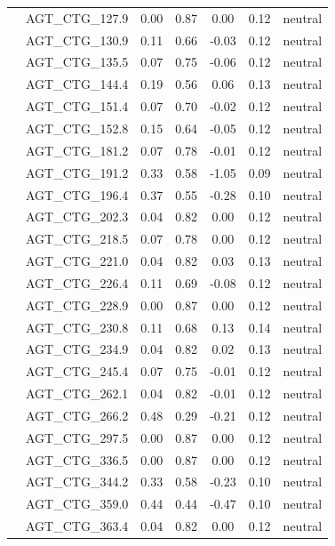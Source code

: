 \documentclass[11pt,]{article}
\begin{document}
\begin{longtable}[c]{@{}lcccccc@{}}
& AGT\_CTG\_127.9 & 0.00 & 0.87 & 0.00 & 0.12 & neutral
\\\addlinespace
& AGT\_CTG\_130.9 & 0.11 & 0.66 & -0.03 & 0.12 & neutral
\\\addlinespace
& AGT\_CTG\_135.5 & 0.07 & 0.75 & -0.06 & 0.12 & neutral
\\\addlinespace
& AGT\_CTG\_144.4 & 0.19 & 0.56 & 0.06 & 0.13 & neutral
\\\addlinespace
& AGT\_CTG\_151.4 & 0.07 & 0.70 & -0.02 & 0.12 & neutral
\\\addlinespace
& AGT\_CTG\_152.8 & 0.15 & 0.64 & -0.05 & 0.12 & neutral
\\\addlinespace
& AGT\_CTG\_181.2 & 0.07 & 0.78 & -0.01 & 0.12 & neutral
\\\addlinespace
& AGT\_CTG\_191.2 & 0.33 & 0.58 & -1.05 & 0.09 & neutral
\\\addlinespace
& AGT\_CTG\_196.4 & 0.37 & 0.55 & -0.28 & 0.10 & neutral
\\\addlinespace
& AGT\_CTG\_202.3 & 0.04 & 0.82 & 0.00 & 0.12 & neutral
\\\addlinespace
& AGT\_CTG\_218.5 & 0.07 & 0.78 & 0.00 & 0.12 & neutral
\\\addlinespace
& AGT\_CTG\_221.0 & 0.04 & 0.82 & 0.03 & 0.13 & neutral
\\\addlinespace
& AGT\_CTG\_226.4 & 0.11 & 0.69 & -0.08 & 0.12 & neutral
\\\addlinespace
& AGT\_CTG\_228.9 & 0.00 & 0.87 & 0.00 & 0.12 & neutral
\\\addlinespace
& AGT\_CTG\_230.8 & 0.11 & 0.68 & 0.13 & 0.14 & neutral
\\\addlinespace
& AGT\_CTG\_234.9 & 0.04 & 0.82 & 0.02 & 0.13 & neutral
\\\addlinespace
& AGT\_CTG\_245.4 & 0.07 & 0.75 & -0.01 & 0.12 & neutral
\\\addlinespace
& AGT\_CTG\_262.1 & 0.04 & 0.82 & -0.01 & 0.12 & neutral
\\\addlinespace
& AGT\_CTG\_266.2 & 0.48 & 0.29 & -0.21 & 0.12 & neutral
\\\addlinespace
& AGT\_CTG\_297.5 & 0.00 & 0.87 & 0.00 & 0.12 & neutral
\\\addlinespace
& AGT\_CTG\_336.5 & 0.00 & 0.87 & 0.00 & 0.12 & neutral
\\\addlinespace
& AGT\_CTG\_344.2 & 0.33 & 0.58 & -0.23 & 0.10 & neutral
\\\addlinespace
& AGT\_CTG\_359.0 & 0.44 & 0.44 & -0.47 & 0.10 & neutral
\\\addlinespace
& AGT\_CTG\_363.4 & 0.04 & 0.82 & 0.00 & 0.12 & neutral

\end{longtable}
\end{document}
